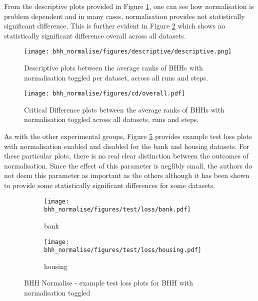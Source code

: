 From the descriptive plots provided in Figure \ref{fig:results:normalise:descriptive:descriptive}, one can see how normalisation is problem dependent and in many cases, normalisation provides not statistically significant difference. This is further evident in Figure \ref{fig:results:normalise:descriptive:cd} which shows no statistically significant difference overall across all datasets.

\begin{figure}[htbp]
	\centering
	\texttt{[image: bhh\_normalise/figures/descriptive/descriptive.png]}
	\caption{Descriptive plots between the average ranks of \Acsp{BHH} with normalisation toggled per dataset, across all runs and steps.}
	\label{fig:results:normalise:descriptive:descriptive}
\end{figure}

\begin{figure}[htbp]
	\centering
	\texttt{[image: bhh\_normalise/figures/cd/overall.pdf]}
	\caption{Critical Difference plots between the average ranks of \Acsp{BHH} with normalisation toggled across all datasets, runs and steps.}
	\label{fig:results:normalise:descriptive:cd}
\end{figure}

As with the other experimental groups, Figure \ref{fig:results:normalise:figures:loss} provides example test loss plots with normalisation enabled and disabled for the bank and housing datasets. For these particular plots, there is no real clear distinction between the outcomes of normalisation. Since the effect of this parameter is neglibly small, the authors do not deem this parameter as important as the others although it has been shown to provide some statistically significant differences for some datasets.


\begin{figure}[htbp]
	\begin{subfigure}{0.5\textwidth}
		\centering
		\texttt{[image: bhh\_normalise/figures/test/loss/bank.pdf]}
		\caption{bank}
		\label{fig:results:normalise:figures:loss1}
	\end{subfigure}
	\begin{subfigure}{0.5\textwidth}
		\centering
		\texttt{[image: bhh\_normalise/figures/test/loss/housing.pdf]}
		\caption{housing}
		\label{fig:results:normalise:figures:loss2}
	\end{subfigure}
	\caption{\Acs{BHH} Normalise - example test loss plots for \Acs{BHH} with normalisation toggled}
	\label{fig:results:normalise:figures:loss}
\end{figure}


